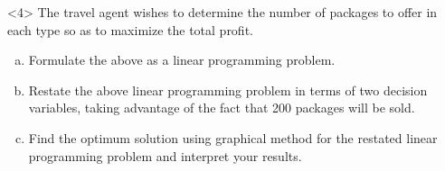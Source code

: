 \begin{frameExample}{}{}
    


  \begin{onlyenv}<4>
    The travel agent wishes to determine the number of packages to offer in each type so as to maximize the total profit.    
          \begin{enumerate}[a)]
    \item Formulate the above as a linear programming problem.
    \item Restate the above linear programming problem in terms of two decision variables, taking advantage of the fact that 200 packages will be sold.
    \item Find the optimum solution using graphical method for the restated linear programming problem and interpret your results.
    \end{enumerate}
    \end{onlyenv}
\end{frameExample}
